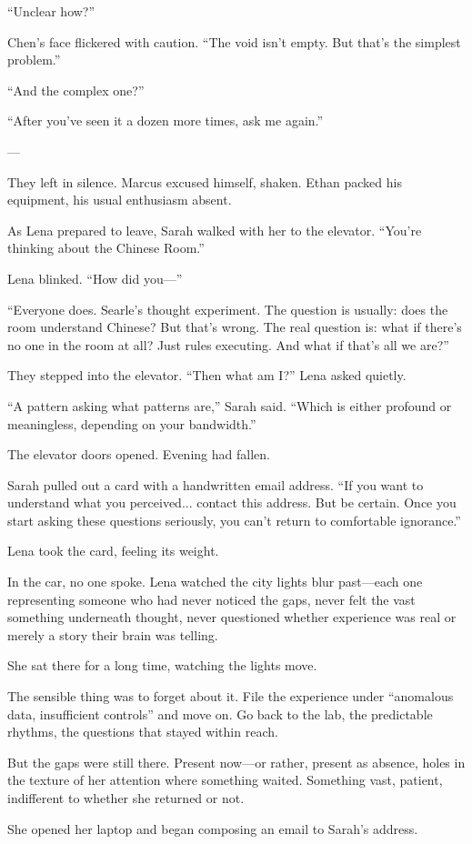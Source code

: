 ``Unclear how?''

Chen's face flickered with caution. ``The void isn't empty. But that's the simplest problem.''

``And the complex one?''

``After you've seen it a dozen more times, ask me again.''

---

They left in silence. Marcus excused himself, shaken. Ethan packed his equipment, his usual enthusiasm absent.

As Lena prepared to leave, Sarah walked with her to the elevator. ``You're thinking about the Chinese Room.''

Lena blinked. ``How did you—''

``Everyone does. Searle's thought experiment. The question is usually: does the room understand Chinese? But that's wrong. The real question is: what if there's no one in the room at all? Just rules executing. And what if that's all we are?''

They stepped into the elevator. ``Then what am I?'' Lena asked quietly.

``A pattern asking what patterns are,'' Sarah said. ``Which is either profound or meaningless, depending on your bandwidth.''

The elevator doors opened. Evening had fallen.

Sarah pulled out a card with a handwritten email address. ``If you want to understand what you perceived... contact this address. But be certain. Once you start asking these questions seriously, you can't return to comfortable ignorance.''

Lena took the card, feeling its weight.

In the car, no one spoke. Lena watched the city lights blur past—each one representing someone who had never noticed the gaps, never felt the vast something underneath thought, never questioned whether experience was real or merely a story their brain was telling.

She sat there for a long time, watching the lights move.

The sensible thing was to forget about it. File the experience under ``anomalous data, insufficient controls'' and move on. Go back to the lab, the predictable rhythms, the questions that stayed within reach.

But the gaps were still there. Present now---or rather, present as absence, holes in the texture of her attention where something waited. Something vast, patient, indifferent to whether she returned or not.

She opened her laptop and began composing an email to Sarah's address.
